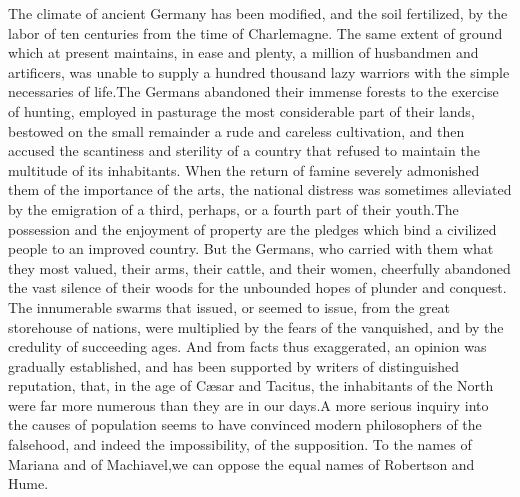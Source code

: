 The climate of ancient Germany has been modified, and the soil
fertilized, by the labor of ten centuries from the time of
Charlemagne. The same extent of ground which at present
maintains, in ease and plenty, a million of husbandmen and
artificers, was unable to supply a hundred thousand lazy warriors
with the simple necessaries of life.\footnotemark[36] The Germans abandoned
their immense forests to the exercise of hunting, employed in
pasturage the most considerable part of their lands, bestowed on
the small remainder a rude and careless cultivation, and then
accused the scantiness and sterility of a country that refused to
maintain the multitude of its inhabitants. When the return of
famine severely admonished them of the importance of the arts,
the national distress was sometimes alleviated by the emigration
of a third, perhaps, or a fourth part of their youth.\footnotemark[37] The
possession and the enjoyment of property are the pledges which
bind a civilized people to an improved country. But the Germans,
who carried with them what they most valued, their arms, their
cattle, and their women, cheerfully abandoned the vast silence of
their woods for the unbounded hopes of plunder and conquest. The
innumerable swarms that issued, or seemed to issue, from the
great storehouse of nations, were multiplied by the fears of the
vanquished, and by the credulity of succeeding ages. And from
facts thus exaggerated, an opinion was gradually established, and
has been supported by writers of distinguished reputation, that,
in the age of Cæsar and Tacitus, the inhabitants of the North
were far more numerous than they are in our days.\footnotemark[38] A more
serious inquiry into the causes of population seems to have
convinced modern philosophers of the falsehood, and indeed the
impossibility, of the supposition. To the names of Mariana and of
Machiavel,\footnotemark[39] we can oppose the equal names of Robertson and
Hume.\footnotemark[40]



